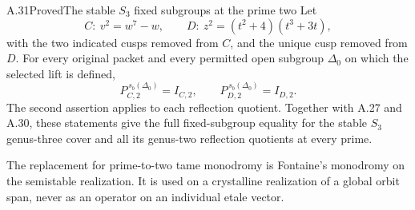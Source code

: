 \begin{statement}{A.31}{Proved}{The stable \(S_3\) fixed subgroups at the prime two}
Let
\[
 C:\ v^2=w^7-w,\qquad
 D:\ z^2=(t^2+4)(t^3+3t),
\]
with the two indicated cusps removed from \(C\), and the unique
cusp removed from \(D\). For every original packet and every
permitted open subgroup \(\Delta_0\) on which the selected lift
is defined,
\[
 P_{C,2}^{\,s_b(\Delta_0)}=I_{C,2},
 \qquad
 P_{D,2}^{\,s_b(\Delta_0)}=I_{D,2}.                 \tag{A.31.1}
\]
The second assertion applies to each reflection quotient.
Together with A.27 and A.30, these statements give the full
fixed-subgroup equality for the stable \(S_3\) genus-three cover
and all its genus-two reflection quotients at every prime.

The replacement for prime-to-two tame monodromy is Fontaine's
monodromy on the semistable realization. It is used on a
crystalline realization of a global orbit span, never as an
operator on an individual etale vector.
\end{statement}
